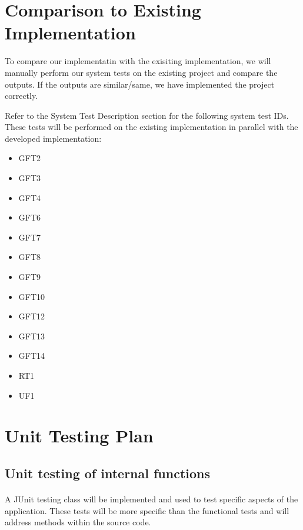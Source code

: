 \documentclass[12pt, titlepage]{article}
\begin{document}
\section{Comparison to Existing Implementation}	

To compare our implementatin with the exisiting implementation, we will manually perform our system tests on the existing project and compare the outputs. If the outputs are similar/same, we have implemented the project correctly. 

Refer to the System Test Description section for the following system test IDs.
These tests will be performed on the existing implementation in parallel with the developed implementation:

\begin{itemize}

\item{}
GFT2
\item{}
GFT3
\item{}
GFT4
\item{}
GFT6
\item{}
GFT7
\item{}
GFT8
\item{}
GFT9
\item{}
GFT10
\item{}
GFT12
\item{}
GFT13
\item{}
GFT14
\item{}
RT1
\item{}
UF1

\end{itemize}
				
\section{Unit Testing Plan}
		
\subsection{Unit testing of internal functions}

\paragraph{}
A JUnit testing class will be implemented and used to test specific aspects of the application. These tests will be more specific than the functional tests and will address methods within the source code.
\end{document}
